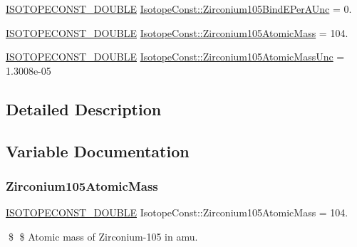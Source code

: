 \begin{DoxyCompactItemize}
\mbox{\hyperlink{group___isotope_const-_macros_ga8f45a7272ce02c0b4c65c44636ed719a}{I\+S\+O\+T\+O\+P\+E\+C\+O\+N\+S\+T\+\_\+\+D\+O\+U\+B\+LE}} \mbox{\hyperlink{group___isotope_const-_zirconium-_zr105_ga9820e094aea7502ef609ee1c26fab1b1}{Isotope\+Const\+::\+Zirconium105\+Bind\+E\+Per\+A\+Unc}} = 0.
\item 
\mbox{\hyperlink{group___isotope_const-_macros_ga8f45a7272ce02c0b4c65c44636ed719a}{I\+S\+O\+T\+O\+P\+E\+C\+O\+N\+S\+T\+\_\+\+D\+O\+U\+B\+LE}} \mbox{\hyperlink{group___isotope_const-_zirconium-_zr105_ga0a03639e889c2682def998dfc186eaba}{Isotope\+Const\+::\+Zirconium105\+Atomic\+Mass}} = 104.
\item 
\mbox{\hyperlink{group___isotope_const-_macros_ga8f45a7272ce02c0b4c65c44636ed719a}{I\+S\+O\+T\+O\+P\+E\+C\+O\+N\+S\+T\+\_\+\+D\+O\+U\+B\+LE}} \mbox{\hyperlink{group___isotope_const-_zirconium-_zr105_ga1e6ec6824cd010907e1cad38ce6e0801}{Isotope\+Const\+::\+Zirconium105\+Atomic\+Mass\+Unc}} = 1.\+3008e-\/05
\end{DoxyCompactItemize}


\subsection{Detailed Description}


\subsection{Variable Documentation}
\mbox{\label{group___isotope_const-_zirconium-_zr105_ga0a03639e889c2682def998dfc186eaba}} 
\subsubsection{\texorpdfstring{Zirconium105\+Atomic\+Mass}{Zirconium105AtomicMass}}
{\footnotesize\ttfamily \mbox{\hyperlink{group___isotope_const-_macros_ga8f45a7272ce02c0b4c65c44636ed719a}{I\+S\+O\+T\+O\+P\+E\+C\+O\+N\+S\+T\+\_\+\+D\+O\+U\+B\+LE}} Isotope\+Const\+::\+Zirconium105\+Atomic\+Mass = 104.}

\$ \$ Atomic mass of Zirconium-\/105 in amu. \mbox{\label{group___isotope_const-_zirconium-_zr105_ga1e6ec6824cd010907e1cad38ce6e0801}} 
